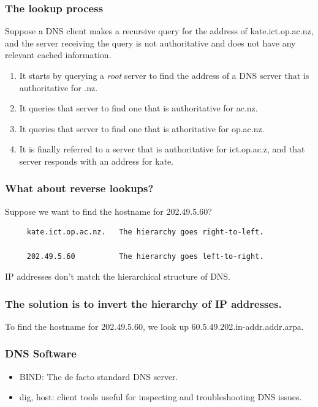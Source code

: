 \documentclass[10pt]{beamer}
\begin{document}
\begin{frame}
  \frametitle{The lookup process}

 Suppose a DNS client makes a recursive query for the address of
 kate.ict.op.ac.nz, and the server receiving the query is not authoritative
 and does not have any relevant cached information.
 \begin{enumerate}
  \item It starts by querying a \emph{root} server to find the address of
        a DNS server that is authoritative for .nz.
  \item It queries that server to find one that is authoritative for ac.nz.
  \item It queries that server to find one that is athoritative for op.ac.nz.
  \item It is finally referred to a server that is authoritative for ict.op.ac.z, and that server responds with an address for kate.
 \end{enumerate}

\end{frame}



\begin{frame}[fragile]
  \frametitle{What about reverse lookups?}

 Suppose we want to find the hostname for 202.49.5.60?

 \begin{verbatim}
     kate.ict.op.ac.nz.   The hierarchy goes right-to-left.
    
     202.49.5.60          The hierarchy goes left-to-right.
 \end{verbatim}

IP addresses don't match the hierarchical structure of DNS.
\end{frame}


\begin{frame}
  \frametitle{The solution is to invert the hierarchy of IP addresses.}
   
  To find the hostname for 202.49.5.60, we look up 
  60.5.49.202.in-addr.addr.arpa.

\end{frame}


\begin{frame}
  \frametitle{DNS Software}

 \begin{itemize}
  \item BIND: The de facto standard DNS server.
  \item dig, host: client tools useful for inspecting and troubleshooting
        DNS issues.
 \end{itemize}

\end{frame}
\end{document}
